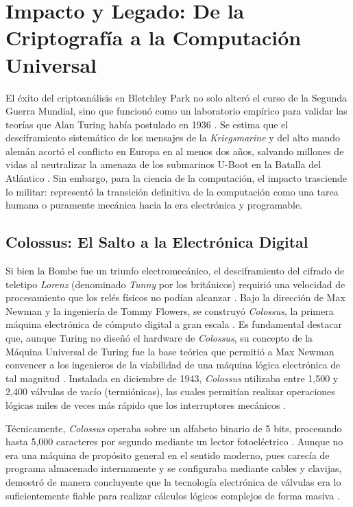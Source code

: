 \section{Impacto y Legado: De la Criptografía a la Computación Universal}

El éxito del criptoanálisis en Bletchley Park no solo alteró el curso de la Segunda Guerra Mundial, sino que funcionó como un laboratorio empírico para validar las teorías que Alan Turing había postulado en 1936 \cite{hodges2014turing}. Se estima que el desciframiento sistemático de los mensajes de la \textit{Kriegsmarine} y del alto mando alemán acortó el conflicto en Europa en al menos dos años, salvando millones de vidas al neutralizar la amenaza de los submarinos U-Boot en la Batalla del Atlántico \cite{copeland2006colossus, lahoz2012turing}. Sin embargo, para la ciencia de la computación, el impacto trasciende lo militar: representó la transición definitiva de la computación como una tarea humana o puramente mecánica hacia la era electrónica y programable.

\subsection{Colossus: El Salto a la Electrónica Digital}

Si bien la Bombe fue un triunfo electromecánico, el desciframiento del cifrado de teletipo \textit{Lorenz} (denominado \textit{Tunny} por los británicos) requirió una velocidad de procesamiento que los relés físicos no podían alcanzar \cite{copeland2006colossus}. Bajo la dirección de Max Newman y la ingeniería de Tommy Flowers, se construyó \textit{Colossus}, la primera máquina electrónica de cómputo digital a gran escala \cite{copeland2006colossus}. Es fundamental destacar que, aunque Turing no diseñó el hardware de \textit{Colossus}, su concepto de la Máquina Universal de Turing fue la base teórica que permitió a Max Newman convencer a los ingenieros de la viabilidad de una máquina lógica electrónica de tal magnitud \cite{hodges2014turing, copeland2006colossus}. Instalada en diciembre de 1943, \textit{Colossus} utilizaba entre 1,500 y 2,400 válvulas de vacío (termiónicas), las cuales permitían realizar operaciones lógicas miles de veces más rápido que los interruptores mecánicos \cite{lahoz2012turing, copeland2006colossus}.

Técnicamente, \textit{Colossus} operaba sobre un alfabeto binario de 5 bits, procesando hasta 5,000 caracteres por segundo mediante un lector fotoeléctrico \cite{copeland2006colossus}. Aunque no era una máquina de propósito general en el sentido moderno, pues carecía de programa almacenado internamente y se configuraba mediante cables y clavijas, demostró de manera concluyente que la tecnología electrónica de válvulas era lo suficientemente fiable para realizar cálculos lógicos complejos de forma masiva \cite{hodges2014turing}. 

